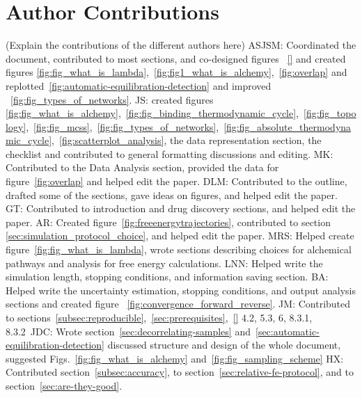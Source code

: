 \documentclass[9pt,bestpractices]{livecoms}
\begin{document}

\clearpage

\clearpage

\section*{Author Contributions}
%
(Explain the contributions of the different authors here)
ASJSM: Coordinated the document, contributed to most sections, and co-designed figures ~\ref{} and created figures \ref{fig:fig_what_is_lambda},~\ref{fig:fig1_what_is_alchemy},~\ref{fig:overlap} and replotted~\ref{fig:automatic-equilibration-detection} and improved ~\ref{fig:fig_types_of_networks}.
JS: created figures \ref{fig:fig_what_is_alchemy},~\ref{fig:fig_binding_thermodynamic_cycle},~\ref{fig:fig_topology},~\ref{fig:fig_mcss},~\ref{fig:fig_types_of_networks},~\ref{fig:fig_absolute_thermodynamic_cycle},~\ref{fig:scatterplot_analysis}, the data representation section, the checklist and contributed to general formatting discussions and editing.
MK: Contributed to the Data Analysis section, provided the data for figure~\ref{fig:overlap} and helped edit the paper.
DLM: Contributed to the outline, drafted some of the sections, gave ideas on figures, and helped edit the paper.
GT: Contributed to introduction and drug discovery sections, and helped edit the paper.
AR: Created figure~\ref{fig:freeenergytrajectories}, contributed to section \ref{sec:simulation_protocol_choice}, and helped edit the paper.
MRS: Helped create figure~\ref{fig:fig_what_is_lambda}, wrote sections describing choices for alchemical pathways and analysis for free energy calculations.
LNN: Helped write the simulation length, stopping conditions, and information saving section.
BA: Helped write the uncertainty estimation, stopping conditions, and output analysis sections and created figure ~\ref{fig:convergence_forward_reverse}.
JM: Contributed to sections~\ref{subsec:reproducible},~\ref{sec:prerequisites},~\ref{} 4.2, 5.3, 6, 8.3.1, 8.3.2\
JDC: Wrote section~\ref{sec:decorrelating-samples} and~\ref{sec:automatic-equilibration-detection} discussed structure and design of the whole document, suggested Figs.~\ref{fig:fig_what_is_alchemy} and~\ref{fig:fig_sampling_scheme} 
HX: Contributed section~\ref{subsec:accuracy}, to section~\ref{sec:relative-fe-protocol}, and to section~\ref{sec:are-they-good}.
\end{document}
